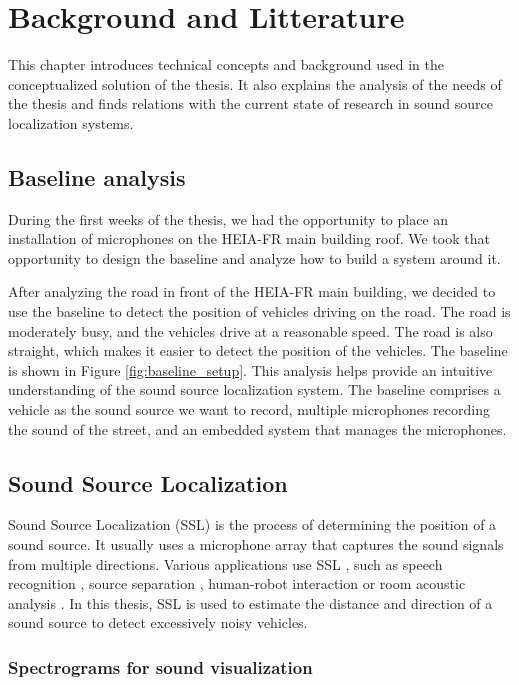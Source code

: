 \chapter{Background and Litterature}
\label{ch:background}

This chapter introduces technical concepts and background used in the conceptualized solution of the thesis. It also explains the analysis of the needs of the thesis and finds relations with the current state of research in sound source localization systems.

\section{Baseline analysis}
\label{sec:baseline_analysis}

During the first weeks of the thesis, we had the opportunity to place an installation of microphones on the HEIA-FR main building roof. We took that opportunity to design the baseline and analyze how to build a system around it.

After analyzing the road in front of the HEIA-FR main building, we decided to use the baseline to detect the position of vehicles driving on the road. The road is moderately busy, and the vehicles drive at a reasonable speed. The road is also straight, which makes it easier to detect the position of the vehicles. The baseline is shown in Figure \ref{fig:baseline_setup}. This analysis helps provide an intuitive understanding of the sound source localization system. The baseline comprises a vehicle as the sound source we want to record, multiple microphones recording the sound of the street, and an embedded system that manages the microphones.

\section{Sound Source Localization}

Sound Source Localization (SSL) is the process of determining the position of a sound source. It usually uses a microphone array that captures the sound signals from multiple directions. Various applications use SSL \cite{Grumiaux_2022}, such as speech recognition \cite{7952261}, source separation \cite{8903121}, human-robot interaction \cite{Li_2016} or room acoustic analysis \cite{amengual}. In this thesis, SSL is used to estimate the distance and direction of a sound source to detect excessively noisy vehicles.

\subsection{Spectrograms for sound visualization}
\label{subsec:spectrograms}


